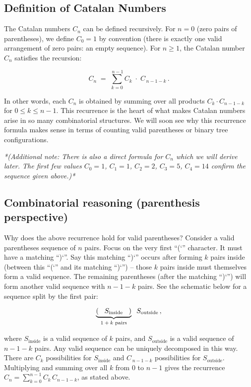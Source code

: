 \documentclass{article}
\begin{document}
\subsection*{Definition of Catalan Numbers}

The Catalan numbers $C_n$ can be defined recursively. For $n=0$ (zero pairs of parentheses), we define $C_0 = 1$ by convention (there is exactly one valid arrangement of zero pairs: an empty sequence). For $n\ge 1$, the Catalan number $C_n$ satisfies the recursion:

\[
C_n \;=\; \sum_{k=0}^{\,n-1} C_k \;\cdot\; C_{\,n-1-k}\,.
\]

In other words, each $C_n$ is obtained by summing over all products $C_k \cdot C_{n-1-k}$ for $0 \le k \le n-1$. This recurrence is the heart of what makes Catalan numbers arise in so many combinatorial structures. We will soon see why this recurrence formula makes sense in terms of counting valid parentheses or binary tree configurations.

\textit{*(Additional note: There is also a direct formula for $C_n$ which we will derive later. The first few values $C_0=1$, $C_1=1$, $C_2=2$, $C_3=5$, $C_4=14$ confirm the sequence given above.)*}

\subsection*{Combinatorial reasoning (parenthesis perspective)}

Why does the above recurrence hold for valid parentheses? Consider a valid parentheses sequence of $n$ pairs. Focus on the very first “(`” character. It must have a matching “)`”. Say this matching “)`” occurs after forming $k$ pairs inside (between this “(`” and its matching “)`”) – those $k$ pairs inside must themselves form a valid sequence. The remaining parentheses (after the matching “)`”) will form another valid sequence with $n-1-k$ pairs. See the schematic below for a sequence split by the first pair:

\[
\underbrace{\vphantom{()}( \;\;\; S_{\text{inside}} \;\;\; )}_{\text{$1+k$ pairs}} \;\; S_{\text{outside}}\,,
\] 

where $S_{\text{inside}}$ is a valid sequence of $k$ pairs, and $S_{\text{outside}}$ is a valid sequence of $n-1-k$ pairs. Any valid sequence can be uniquely decomposed in this way. There are $C_k$ possibilities for $S_{\text{inside}}$ and $C_{\,n-1-k}$ possibilities for $S_{\text{outside}}$. Multiplying and summing over all $k$ from $0$ to $n-1$ gives the recurrence $C_n = \sum_{k=0}^{n-1} C_k\,C_{n-1-k}$, as stated above.
\end{document}
